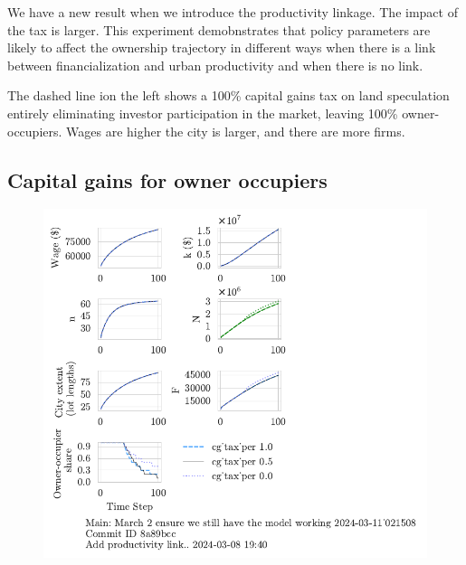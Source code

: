 We have a new result when we introduce the productivity linkage. 
The impact of the tax is larger. This experiment demobnstrates that policy parameters are likely to affect the ownership trajectory in different ways when there is a link between financialization and urban productivity and when there is no link.

The dashed line ion the left shows a 100\% capital gains tax on land speculation entirely eliminating investor participation in the market, leaving 100\%  owner-occupiers.  Wages are higher the city is larger, and there are more firms. 

\newpage
\subsection{Capital gains for owner occupiers}
\begin{figure}[h!tb] 
    \centering
    \includegraphics[scale=.75, trim={0 1.4cm 4.5cm 0},clip]{fig/cg_tax_per-Main-021508.pdf} 

\end{figure}
